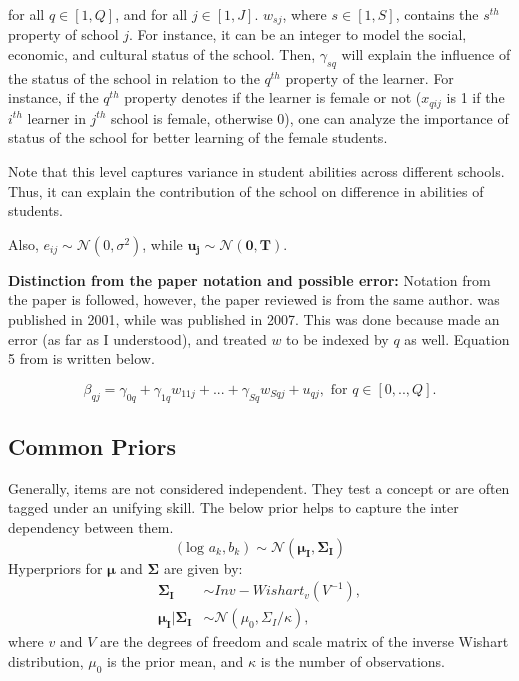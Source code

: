 \documentclass[12pt]{article}
\begin{document}
for all $q \in [1, Q]$, and for all $ j \in [1, J]$. $w_{sj}$, where $s \in [1, S]$, contains the $s^{th}$ property of school $j$. For instance, it can be an integer to model the social, economic, and cultural status of the school. Then, $\gamma_{sq}$ will explain the influence of the status of the school in relation to the $q^{th}$ property of the learner. For instance, if the $q^{th}$ property denotes if the learner is female or not ($x_{qij}$ is 1 if the $i^{th}$ learner in $j^{th}$ school is female, otherwise 0), one can analyze the importance of status of the school for better learning of the female students.

Note that this level captures variance in student abilities across different schools. Thus, it can explain the contribution of the school on difference in abilities of students.

Also, $e_{ij} \sim \mathcal{N}(0, \sigma^2)$, while $\boldsymbol{u_j} \sim \mathcal{N}(\boldsymbol{0}, \boldsymbol{T})$.

\textbf{Distinction from the paper notation and possible error:}
Notation from the paper \cite{fox2007multilevel} is followed, however, the paper reviewed is \cite{fox2001bayesian} from the same author. \cite{fox2001bayesian} was published in 2001, while \cite{fox2007multilevel} was published in 2007. This was done because \cite{fox2001bayesian} made an error (as far as I understood), and treated $w$ to be indexed by $q$ as well. Equation 5 from \cite{fox2001bayesian} is written below.

\begin{equation*}
    \beta_{qj} = \gamma_{0q} + \gamma_{1q}w_{11j} + ... + \gamma_{Sq}w_{Sqj} + u_{qj}, \text{ for } q\in [0,.., Q].
\end{equation*}

\subsection{Common Priors}
Generally, items are not considered independent. They test a concept or are often tagged under an unifying skill. The below prior helps to capture the inter dependency between them.
\begin{equation*}
    (\text{log }a_k, b_k) \sim \mathcal{N}(\boldsymbol{\mu_I}, \boldsymbol{\Sigma_I})
\end{equation*}
Hyperpriors for $\boldsymbol{\mu}$ and $\boldsymbol{\Sigma}$ are given by:
\begin{align*}
    \boldsymbol{\Sigma_I} & \sim Inv-Wishart_v(V^{-1}),\\
    \boldsymbol{\mu_I}|\boldsymbol{\Sigma_I} & \sim \mathcal{N}(\mu_0, \Sigma_I/\kappa),
\end{align*}
where $v$ and $V$ are the degrees of freedom and scale matrix of the inverse Wishart distribution, $\mu_0$ is the prior mean, and $\kappa$ is the number of observations.
\end{document}
